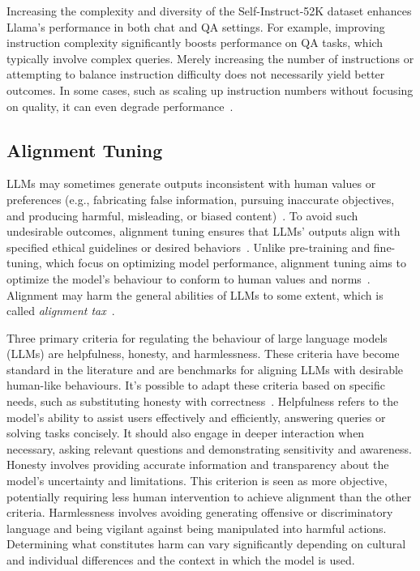 Increasing the complexity and diversity of the Self-Instruct-52K dataset enhances Llama's performance in both chat and QA settings.
For example, improving instruction complexity significantly boosts performance on QA tasks, which typically involve complex queries.
Merely increasing the number of instructions or attempting to balance instruction difficulty does not necessarily yield better outcomes.
In some cases, such as scaling up instruction numbers without focusing on quality, it can even degrade performance~\cite{survey}.

\subsection{Alignment Tuning}
\label{subsec:alignment-tuning}

LLMs may sometimes generate outputs inconsistent with human values or preferences (e.g., fabricating false information, pursuing inaccurate objectives, and producing harmful, misleading, or biased content)~\cite{ouyang2022training, kenton2021alignment}.
To avoid such undesirable outcomes, alignment tuning ensures that LLMs' outputs align with specified ethical guidelines or desired behaviors~\cite{survey}.
Unlike pre-training and fine-tuning, which focus on optimizing model performance, alignment tuning aims to optimize the model's behaviour to conform to human values and norms~\cite{survey}.
Alignment may harm the general abilities of LLMs to some extent, which is called \textit{alignment tax}~\cite{askell2021general}.

Three primary criteria for regulating the behaviour of large language models (LLMs) are helpfulness, honesty, and harmlessness.
These criteria have become standard in the literature and are benchmarks for aligning LLMs with desirable human-like behaviours.
It's possible to adapt these criteria based on specific needs, such as substituting honesty with correctness~\cite{glaese2022improving}.
Helpfulness refers to the model's ability to assist users effectively and efficiently, answering queries or solving tasks concisely.
It should also engage in deeper interaction when necessary, asking relevant questions and demonstrating sensitivity and awareness.
Honesty involves providing accurate information and transparency about the model's uncertainty and limitations.
This criterion is seen as more objective, potentially requiring less human intervention to achieve alignment than the other criteria.
Harmlessness involves avoiding generating offensive or discriminatory language and being vigilant against being manipulated into harmful actions.
Determining what constitutes harm can vary significantly depending on cultural and individual differences and the context in which the model is used.

